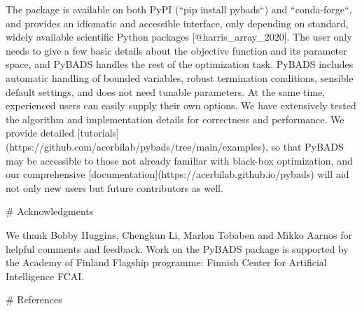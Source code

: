 \documentclass{article}
\begin{document}
\begin{markdown}
The package is available on both PyPI (``pip install pybads``) and ``conda-forge``, and provides an idiomatic and accessible interface, only depending on standard, widely available scientific Python packages [@harris_array_2020]. The user only needs to give a few basic details about the objective function and its parameter space, and PyBADS handles the rest of the optimization task. PyBADS includes automatic handling of bounded variables, robust termination conditions, sensible default settings, and does not need tunable parameters. At the same time, experienced users can easily supply their own options. We have extensively tested the algorithm and implementation details for correctness and performance. We provide detailed [tutorials](https://github.com/acerbilab/pybads/tree/main/examples), so that PyBADS may be accessible to those not already familiar with black-box optimization, and our comprehensive [documentation](https://acerbilab.github.io/pybads) will aid not only new users but future contributors as well.

# Acknowledgments

We thank Bobby Huggins, Chengkun Li, Marlon Tobaben and Mikko Aarnos for helpful comments and feedback.
Work on the PyBADS package is supported by the Academy of Finland Flagship programme: Finnish Center for Artificial Intelligence FCAI.

# References

\end{markdown}
\end{document}
